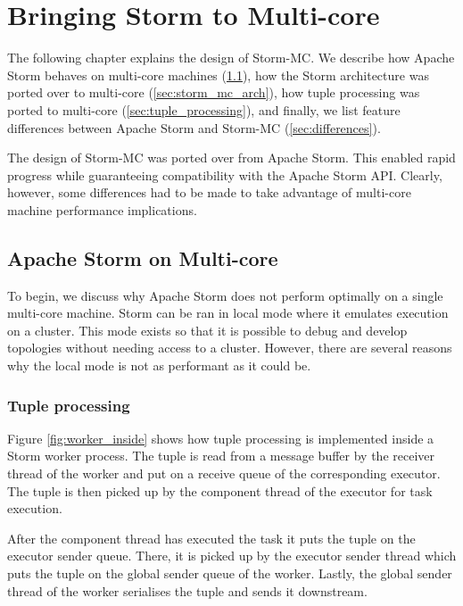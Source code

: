 \chapter{Bringing Storm to Multi-core}

The following chapter explains the design of Storm-MC. We describe how Apache Storm behaves on multi-core machines (\ref{sec:storm_on_mc}), how the Storm architecture was ported over to multi-core (\ref{sec:storm_mc_arch}), how tuple processing was ported to multi-core (\ref{sec:tuple_processing}), and finally, we list feature differences between Apache Storm and Storm-MC (\ref{sec:differences}).

The design of Storm-MC was ported over from Apache Storm. This enabled rapid progress while guaranteeing compatibility with the Apache Storm API. Clearly, however, some differences had to be made to take advantage of multi-core machine performance implications. 

\section{Apache Storm on Multi-core}
\label{sec:storm_on_mc}

To begin, we discuss why Apache Storm does not perform optimally on a single multi-core machine. Storm can be ran in local mode where it emulates execution on a cluster. This mode exists so that it is possible to debug and develop topologies without needing access to a cluster. However, there are several reasons why the local mode is not as performant as it could be.

\subsection{Tuple processing}

Figure \ref{fig:worker_inside} shows how tuple processing is implemented inside a Storm worker process. The tuple is read from a message buffer by the receiver thread of the worker and put on a receive queue of the corresponding executor. The tuple is then picked up by the component thread of the executor for task execution.

After the component thread has executed the task it puts the tuple on the executor sender queue. There, it is picked up by the executor sender thread which puts the tuple on the global sender queue of the worker. Lastly, the global sender thread of the worker serialises the tuple and sends it downstream.

